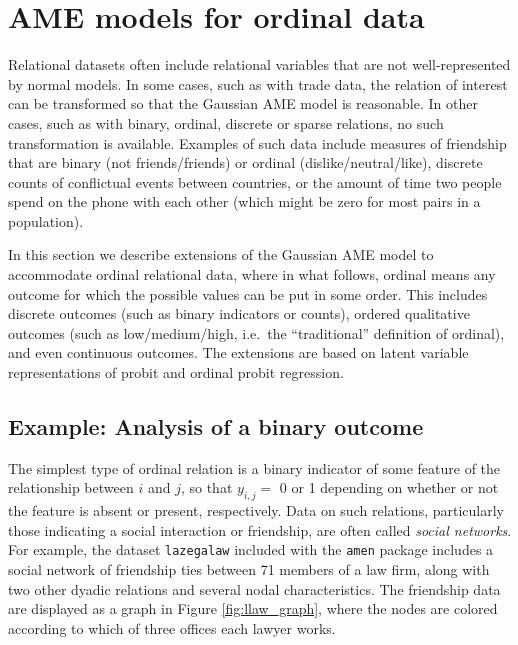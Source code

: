 \documentclass[11pt]{article}\usepackage[]{graphicx}\usepackage[]{color}
\begin{document}




\section{AME models for ordinal data} 
Relational datasets often include relational variables that 
are not well-represented by normal models. 
In some cases, such as with trade data, the relation of interest can be transformed 
so that the 
Gaussian 
AME model is reasonable.  In other cases, 
such as with binary, ordinal, discrete or sparse relations, 
 no such transformation is available.  
Examples of such data include measures of friendship that 
are binary (not friends/friends) or ordinal (dislike/neutral/like), 
discrete counts of conflictual events between countries, or the amount of time 
two people spend on the phone with each other  (which might be zero 
for most pairs in a population). 

In this section we describe extensions of the Gaussian AME model 
to accommodate ordinal relational data, where in what follows, 
ordinal means any outcome for which the possible values 
can be put in some order. This includes discrete outcomes 
(such as binary indicators or counts), ordered qualitative 
outcomes (such as low/medium/high, i.e.\  the
``traditional'' definition of ordinal), and even continuous outcomes. 
The extensions are based on latent variable 
representations of probit and ordinal probit regression. 

\subsection{Example: Analysis of a binary outcome}
The simplest type of ordinal relation is a binary indicator of some 
feature of the relationship between $i$ and $j$, 
so that $y_{i,j} = $ 0 or 1 depending on whether or not the 
feature is absent or present, respectively. 
Data on such relations, particularly those indicating 
a  social interaction or friendship, are often called 
\emph{social networks}. For example, 
the dataset {\tt lazegalaw} included with the {\tt amen} package
includes a social network of friendship ties between 71 members 
of a law firm, 
along with two other dyadic relations and several nodal 
characteristics. The friendship data are displayed as a graph in Figure 
\ref{fig:llaw_graph}, where the nodes are colored according to which 
of three offices each lawyer works. 
\end{document}
